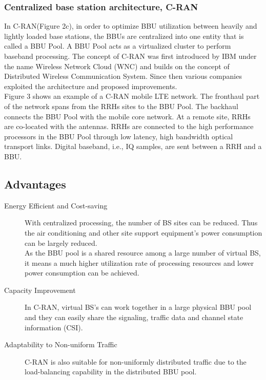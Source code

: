\documentclass{article}
\begin{document}


\subsubsection{Centralized base station architecture, C-RAN} 

In C-RAN(Figure 2c), in order to optimize BBU utilization between
heavily and lightly loaded base stations, the BBUs are 
centralized into one entity that is called a BBU Pool.
A BBU Pool acts as a virtualized cluster to perform baseband 
processing. The concept of C-RAN was first introduced by IBM
under the name Wireless Network Cloud (WNC) and builds
on the concept of Distributed Wireless Communication System.
Since then various companies exploited the architecture and 
proposed improvements.\\


Figure 3 shows an example of a C-RAN mobile LTE
network. The fronthaul part of the network spans from the
RRHs sites to the BBU Pool. The backhaul connects the BBU
Pool with the mobile core network. At a remote site, RRHs are
co-located with the antennas. RRHs are connected to the high
performance processors in the BBU Pool through low latency,
high bandwidth optical transport links. Digital baseband, i.e.,
IQ samples, are sent between a RRH and a BBU.\nocite{checko14}




\subsection{Advantages}\nocite{cmri11}

\begin{description}
    
    \item [Energy Efficient and Cost-saving] With centralized 
    processing, the number of BS sites can be reduced. Thus 
    the air conditioning and other site support equipment's 
    power consumption can be largely reduced.\\ 
    As the BBU pool is a shared resource among a large number
    of virtual BS, it means a much higher utilization rate of
    processing resources and lower power consumption can be
    achieved.
    
    \item [Capacity Improvement] In C-RAN, virtual BS's can work
    together in a large physical BBU pool and they can easily 
    share the signaling, traffic data and channel state 
    information (CSI). 
    
    \item [Adaptability to Non-uniform Traffic] C-RAN is also
    suitable for non-uniformly distributed traffic due to the 
    load-balancing capability in the distributed BBU pool.
    
\end{description}
\end{document}
